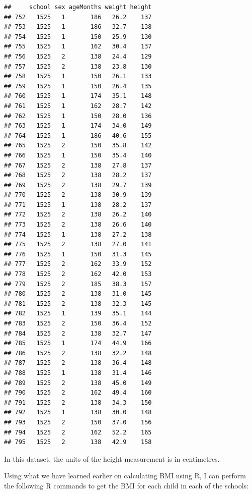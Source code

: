 \documentclass[
  12pt,
]{book}
\begin{document}
\begin{verbatim}
##     school sex ageMonths weight height
## 752   1525   1       186   26.2    137
## 753   1525   1       186   32.7    138
## 754   1525   1       150   25.9    130
## 755   1525   1       162   30.4    137
## 756   1525   2       138   24.4    129
## 757   1525   2       138   23.8    130
## 758   1525   1       150   26.1    133
## 759   1525   1       150   26.4    135
## 760   1525   1       174   35.1    148
## 761   1525   1       162   28.7    142
## 762   1525   1       150   28.0    136
## 763   1525   1       174   34.0    149
## 764   1525   1       186   40.6    155
## 765   1525   2       150   35.8    142
## 766   1525   1       150   35.4    140
## 767   1525   2       138   27.8    137
## 768   1525   2       138   28.2    137
## 769   1525   2       138   29.7    139
## 770   1525   2       138   30.9    139
## 771   1525   1       138   28.2    137
## 772   1525   2       138   26.2    140
## 773   1525   2       138   26.6    140
## 774   1525   1       138   27.2    138
## 775   1525   2       138   27.0    141
## 776   1525   1       150   31.3    145
## 777   1525   2       162   33.9    152
## 778   1525   2       162   42.0    153
## 779   1525   2       185   38.3    157
## 780   1525   2       138   31.0    145
## 781   1525   2       138   32.3    145
## 782   1525   1       139   35.1    144
## 783   1525   2       150   36.4    152
## 784   1525   2       138   32.7    147
## 785   1525   1       174   44.9    166
## 786   1525   2       138   32.2    148
## 787   1525   2       138   36.4    148
## 788   1525   1       138   31.4    146
## 789   1525   2       138   45.0    149
## 790   1525   2       162   49.4    160
## 791   1525   2       138   34.3    150
## 792   1525   1       138   30.0    148
## 793   1525   2       150   37.0    156
## 794   1525   2       162   52.2    165
## 795   1525   2       138   42.9    158
\end{verbatim}

In this dataset, the units of the height measurement is in centimetres.

Using what we have learned earlier on calculating BMI using R, I can perform the following R commands to get the BMI for each child in each of the schools:
\end{document}
